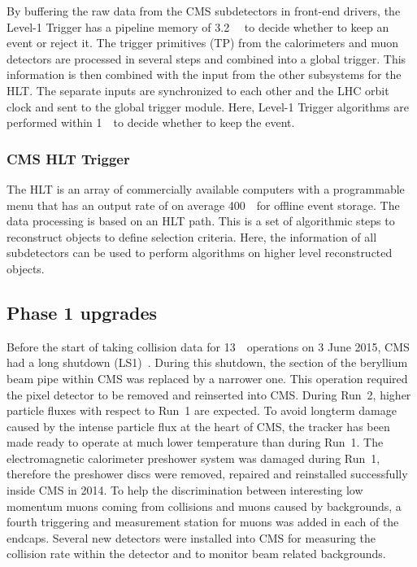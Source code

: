 By buffering the raw data from the CMS subdetectors in front-end drivers, the Level-1 Trigger has a pipeline memory of 3.2~ \micro \second\ to decide whether to keep an event or reject it. 
The trigger primitives (TP) from the calorimeters and muon detectors are processed in several steps and combined into a global trigger. This information is then combined with the input from the other subsystems for the HLT. The separate inputs are synchronized to each other and the LHC orbit clock and sent to the global trigger module. Here, Level-1 Trigger algorithms are performed within 1~\micro \second\ to decide whether to  keep the event. 


\subsubsection*{CMS HLT Trigger}
The HLT is an array of commercially available computers with a programmable menu that has an output rate of on average 400~\hertz\ for offline event storage.
The data processing is based on an HLT path. This is a  set of algorithmic steps to reconstruct objects to define selection criteria.  Here, the information of all subdetectors can be used to perform algorithms on higher level reconstructed objects. 

\subsection{Phase 1 upgrades}
\label{sec:Phase1}
Before the start of taking collision data for 13~\TeV\ operations on 3 June 2015, CMS had a long shutdown (LS1)~\cite{Pralavorio:2024977}. During this shutdown, the section of the beryllium beam pipe within CMS was replaced by a narrower one. This operation required the pixel detector to be  removed and reinserted into CMS. During Run~2, higher particle fluxes with respect to Run~1 are expected. To avoid longterm damage caused by the intense particle flux at the heart of CMS, the tracker has been made ready to operate at much lower temperature than during Run~1.  The electromagnetic calorimeter preshower system was damaged during Run~1, therefore the preshower discs were removed, repaired and reinstalled successfully inside CMS in 2014. To help the discrimination between interesting low momentum muons coming from collisions and muons caused by backgrounds, a fourth triggering and measurement station for muons was added in each of the endcaps. Several new detectors were installed into CMS for measuring the collision rate within the detector and to monitor beam related backgrounds. 

